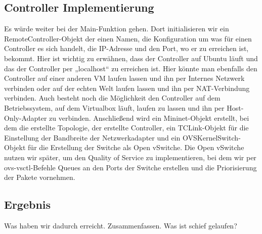 \documentclass[fontsize=12pt,paper=a4,open=any,parskip=half,
  twoside=false,toc=listof,toc=bibliography,fleqn,leqno,
  captions=nooneline,captions=tableabove,british]{scrbook}
\begin{document}
\subsection{Controller Implementierung}
Es würde weiter bei der Main-Funktion gehen. Dort initialisieren wir ein RemoteController-Objekt der einen Namen, die Konfiguration um was für einen Controller es sich handelt, die IP-Adresse und den Port, wo er zu erreichen ist, bekommt. Hier ist wichtig zu erwähnen, dass der Controller auf Ubuntu läuft und das der Controller per „localhost“ zu erreichen ist. Hier könnte man ebenfalls den Controller auf einer anderen VM laufen lassen und ihn per Internes Netzwerk verbinden oder auf der echten Welt laufen lassen und ihn per NAT-Verbindung verbinden. Auch besteht noch die Möglichkeit den Controller auf dem Betriebssystem, auf dem Virtualbox läuft, laufen zu lassen und ihn per Host-Only-Adapter zu verbinden. Anschließend wird ein Mininet-Objekt erstellt, bei dem die erstellte Topologie, der erstellte Controller, ein TCLink-Objekt für die Einstellung der Bandbreite der Netzwerkadapter und ein OVSKernelSwitch-Objekt für die Erstellung der Switche als Open vSwitche. Die Open vSwitche nutzen wir später, um den Quality of Service zu implementieren, bei dem wir per ovs-vsctl-Befehle Queues an den Ports der Switche erstellen und die Priorisierung der Pakete vornehmen. 

\subsection{Ergebnis}
Was haben wir dadurch erreicht. Zusammenfassen.
Was ist schief gelaufen?
\end{document}
